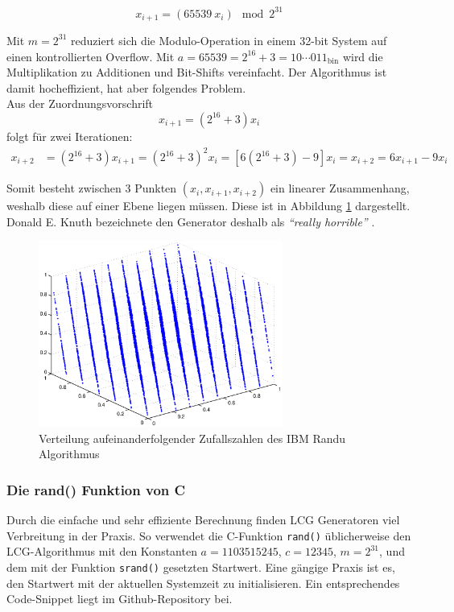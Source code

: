 \documentclass{book}
\begin{document}
\begin{refsection}
\begin{equation}
	x_{i+1} = \left( 65539 \: x_i \right) \mod{2^{31}}
	\label{equ:ibm_randu}
\end{equation}

Mit $m = 2^{31}$ reduziert sich die Modulo-Operation in einem 32-bit System auf einen kontrollierten Overflow. Mit $a = 65539 = 2^{16} + 3 = 10\cdots011_{\text{bin}}$ wird die Multiplikation zu Additionen und Bit-Shifts vereinfacht. Der Algorithmus ist damit hocheffizient, hat aber folgendes Problem. \\

Aus der Zuordnungsvorschrift
\begin{equation*}
	x_{i+1} = (2^{16} + 3) x_i
\end{equation*}
folgt für zwei Iterationen:
\begin{align*}
	x_{i+2} &= (2^{16} + 3) x_{i+1} = (2^{16} + 3)^2 x_i = [6 (2^{16} + 3) - 9] x_i = x_{i+2} = 6 x_{i+1} - 9 x_i
\end{align*}

Somit besteht zwischen 3 Punkten $(x_i, x_{i+1},x_{i+2})$ ein linearer Zusammenhang, weshalb diese auf einer Ebene liegen müssen. Diese ist in Abbildung \ref{fig:IBMRandu} dargestellt. Donald E. Knuth bezeichnete den Generator deshalb als \textit{``really horrible''} \cite[p.173]{rng:KnuthVol2}. \\

\begin{figure}[htbp]
	\centering
	\includegraphics[width=8cm]{images/ibm_randu.eps}
	\caption{Verteilung aufeinanderfolgender Zufallszahlen des IBM Randu Algorithmus}
	\label{fig:IBMRandu}
\end{figure}

\subsubsection{Die rand() Funktion von C}
Durch die einfache und sehr effiziente Berechnung finden LCG Generatoren viel Verbreitung in der Praxis. So verwendet die C-Funktion \texttt{rand()} üblicherweise den LCG-Algorithmus mit den Konstanten $a=1103515245$, $c=12345$, $m=2^{31}$, und dem mit der Funktion \texttt{srand()} gesetzten Startwert. \cite{rng:randFunction} Eine gängige Praxis ist es, den Startwert mit der aktuellen Systemzeit zu initialisieren. Ein entsprechendes Code-Snippet liegt im Github-Repository bei. \cite{rng:githubRepo} \\


\end{refsection}
\end{document}

